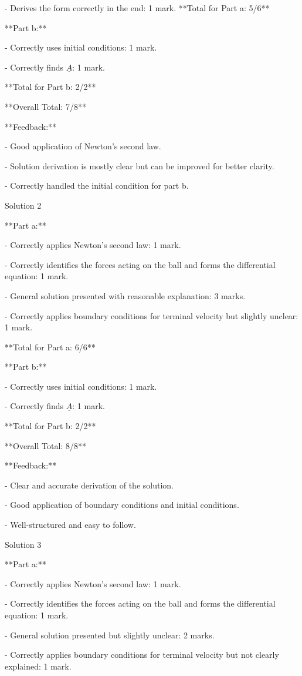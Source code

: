 \documentclass[a4paper,11pt]{article}
\begin{document}
- Derives the form correctly in the end: 1 mark.
**Total for Part a: 5/6**

**Part b:**

- Correctly uses initial conditions: 1 mark.

- Correctly finds \( \underline{A} \): 1 mark.

**Total for Part b: 2/2**

**Overall Total: 7/8**

**Feedback:**

- Good application of Newton's second law.

- Solution derivation is mostly clear but can be improved for better clarity.

- Correctly handled the initial condition for part b.

Solution 2

**Part a:**

- Correctly applies Newton's second law: 1 mark.

- Correctly identifies the forces acting on the ball and forms the differential equation: 1 mark.

- General solution presented with reasonable explanation: 3 marks.

- Correctly applies boundary conditions for terminal velocity but slightly unclear: 1 mark.

**Total for Part a: 6/6**

**Part b:**

- Correctly uses initial conditions: 1 mark.

- Correctly finds \( \underline{A} \): 1 mark.

**Total for Part b: 2/2**

**Overall Total: 8/8**

**Feedback:**

- Clear and accurate derivation of the solution.

- Good application of boundary conditions and initial conditions.

- Well-structured and easy to follow.

Solution 3

**Part a:**

- Correctly applies Newton's second law: 1 mark.

- Correctly identifies the forces acting on the ball and forms the differential equation: 1 mark.

- General solution presented but slightly unclear: 2 marks.

- Correctly applies boundary conditions for terminal velocity but not clearly explained: 1 mark.
\end{document}
